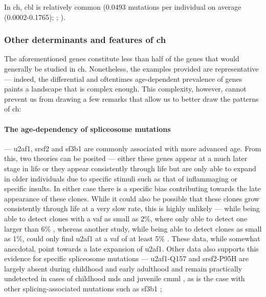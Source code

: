 In \ac{ch}, \ac{cbl} is relatively common \cite{Jaiswal2014-rl,Genovese2014-eu,Zink2017-zi,Bolton2020-ct,Coombs2017-ph,Acuna-Hidalgo2017-ng,Young2016-du,Young2019-rz} (0.0493 mutations per individual on average (0.0002-0.1765); ; ).

\subsubsection{Other determinants and features of \ac{ch}}

The aforementioned genes constitute less than half of the genes that would generally be studied in \ac{ch}. Nonetheless, the examples provided are representative --- indeed, the differential and oftentimes age-dependent prevalence of genes paints a landscape that is complex enough. This complexity, however, cannot prevent us from drawing a few remarks that allow us to better draw the patterns of \ac{ch}:
\paragraph{The age-dependency of spliceosome mutations} --- \ac{u2af1}, \ac{srsf2} and \ac{sf3b1} are commonly associated with more advanced age. From this, two theories can be posited --- either these genes appear at a much later stage in life or they appear consistently through life but are only able to expand in older individuals due to specific stimuli such as that of inflammaging \cite{Franceschi2018-be} or specific insults. In either case there is a specific bias contributing towards the late appearance of these clones. While it could also be possible that these clones grow consistently through life at a very slow rate, this is highly unlikely --- while being able to detect clones with a \ac{vaf} as small as 2\%,  where only able to detect one larger than 6\%  \cite{Jaiswal2014-rl}, whereas another study, while being able to detect clones as small as 1\%, could only find \ac{u2af1} at a \ac{vaf} of at least 5\% \cite{Zehir2017-gh}. These data, while somewhat anecdotal, point towards a late expansion of \ac{u2af1}. Other data also supports this evidence for specific spliceosome mutations --- \ac{u2af1}-Q157 and \ac{srsf2}-P95H are largely absent during childhood and early adulthood and remain practically undetected in cases of childhood \ac{mds} and juvenile \ac{cmml} \cite{Kar2013-nw,Hirabayashi2012-jj}, as is the case with other splicing-associated mutations such as \ac{sf3b1} \cite{Lin2014-qr};
